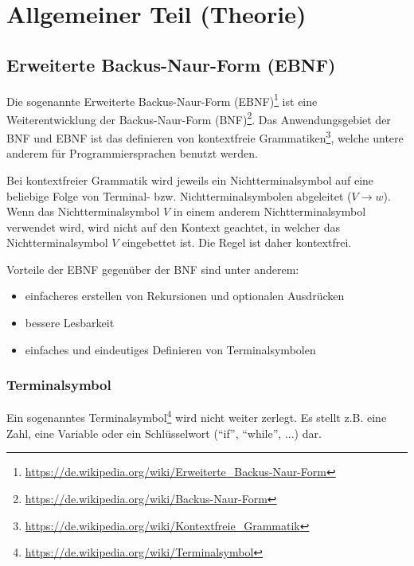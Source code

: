 

\section{Allgemeiner Teil (Theorie)}

\subsection{Erweiterte Backus-Naur-Form (EBNF)}

Die sogenannte Erweiterte Backus-Naur-Form (EBNF)\footnote{\url{https://de.wikipedia.org/wiki/Erweiterte_Backus-Naur-Form}} ist eine Weiterentwicklung der Backus-Naur-Form (BNF)\footnote{\url{https://de.wikipedia.org/wiki/Backus-Naur-Form}}. Das Anwendungsgebiet der BNF und EBNF ist das definieren von  kontextfreie Grammatiken\footnote{\url{https://de.wikipedia.org/wiki/Kontextfreie_Grammatik}}, welche untere anderem f\"ur Programmiersprachen benutzt werden.

Bei kontextfreier Grammatik wird jeweils ein Nichtterminalsymbol auf eine beliebige Folge von Terminal- bzw. Nichtterminalsymbolen abgeleitet ($V \rightarrow w$). Wenn das Nichtterminalsymbol $V$ in einem anderem Nichtterminalsymbol verwendet wird, wird nicht auf den Kontext geachtet, in welcher das Nichtterminalsymbol $V$ eingebettet ist. Die Regel ist daher kontextfrei.

Vorteile der EBNF gegen\"uber der BNF sind unter anderem:

\begin{itemize}
  \item einfacheres erstellen von Rekursionen und optionalen Ausdr\"ucken
  \item bessere Lesbarkeit
  \item einfaches und eindeutiges Definieren von Terminalsymbolen
\end{itemize}

\newpage

\subsubsection{Terminalsymbol}

Ein sogenanntes Terminalsymbol\footnote{\url{https://de.wikipedia.org/wiki/Terminalsymbol}} wird nicht weiter zerlegt. Es stellt z.B. eine Zahl, eine Variable oder ein Schlüsselwort (``if'', ``while'', ...) dar.

